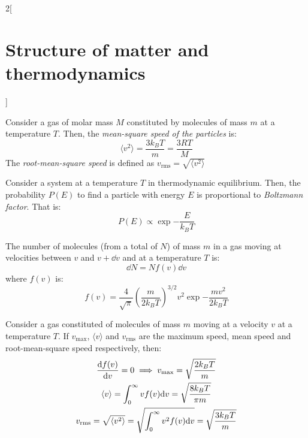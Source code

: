 \documentclass[../../../main.tex]{subfiles}
\begin{document}
\begin{multicols}{2}[\section{Structure of matter and thermodynamics}]
\begin{prop}
  \end{prop}
  \begin{prop}
    Consider a gas of molar mass $M$ constituted by molecules of mass $m$ at a temperature $T$. Then, the \textit{mean-square speed of the particles} is: $$\langle v^2\rangle=\frac{3 k_B T}{m}=\frac{3 R T}{M}$$
    The \textit{root-mean-square speed} is defined as $v_\text{rms}=\sqrt{\langle v^2\rangle}$
  \end{prop}
  \begin{prop}
    Consider a system at a temperature $T$ in thermodynamic equilibrium. Then, the probability $P(E)$ to find a particle with energy $E$ is proportional to \textit{Boltzmann factor}. That is:
    $$P(E)\propto\exp{-\frac{E}{k_BT}}$$
  \end{prop}
  \begin{prop}
    The number of molecules (from a total of $N$) of mass $m$ in a gas moving at velocities between $v$ and $v+\dd v$ and at a temperature $T$ is:
    $$\dd N=Nf(v)\dd v$$ where $f(v)$ is: $$f(v)=\frac{4}{\sqrt{\pi}}{\left(\frac{m}{2k_BT}\right)}^{3/2}v^2\exp{-\frac{mv^2}{2k_BT}}$$
  \end{prop}
  \begin{prop}
    Consider a gas constituted of molecules of mass $m$ moving at a velocity $v$ at a temperature $T$. If $v_\text{max}$, $\langle v\rangle$ and $v_\text{rms}$ are the maximum speed, mean speed and root-mean-square speed respectively, then:
    \begin{gather*}
      \dv{f(v)}{v}=0\implies v_\text{max}=\sqrt{\frac{2k_BT}{m}}\\
      \langle v\rangle=\int_0^\infty vf(v)\dd v=\sqrt{\frac{8k_BT}{\pi m}}\\
      v_\text{rms}=\sqrt{\langle v^2\rangle}=\sqrt{\int_0^\infty v^2f(v)\dd v}=\sqrt{\frac{3k_BT}{m}}
    \end{gather*}
  \end{prop}

\end{multicols}
\end{document}
